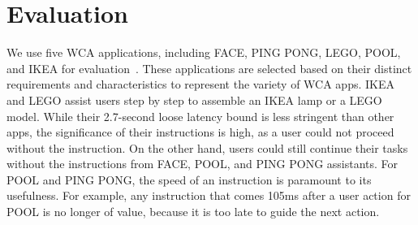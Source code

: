 \section{Evaluation}

We use five WCA applications, including FACE, PING PONG, LEGO, POOL, and IKEA
for evaluation~\cite{chen2017empirical,chen2018application}. These
applications are selected based on their distinct requirements and
characteristics to represent the variety of WCA apps. IKEA and LEGO assist users
step by step to assemble an IKEA lamp or a LEGO model. While their 2.7-second
loose latency bound is less stringent than other apps, the significance of their
instructions is high, as a user could not proceed without the instruction. On
the other hand, users could still continue their tasks without the instructions
from FACE, POOL, and PING PONG assistants. For POOL and PING PONG, the speed of
an instruction is paramount to its usefulness. For example, any instruction that
comes 105ms after a user action for POOL is no longer of value, because it is
too late to guide the next action.

